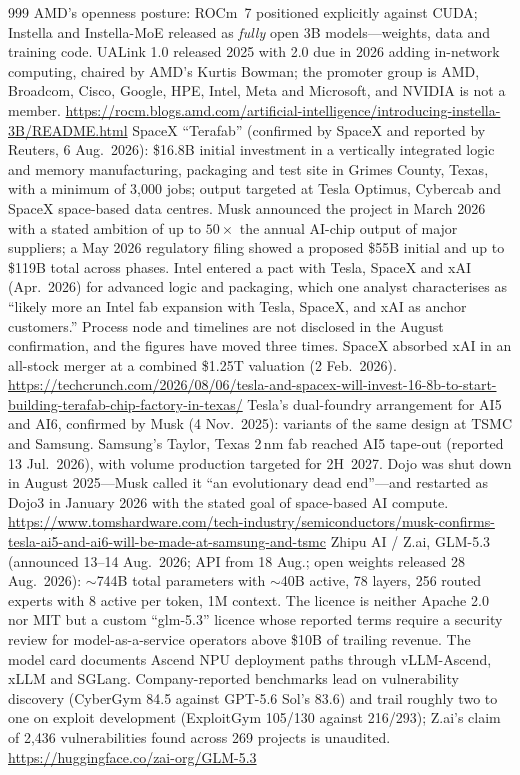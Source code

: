 \begin{thebibliography}{999}
 AMD's openness posture: ROCm~7 positioned explicitly against CUDA; Instella and Instella-MoE released as \emph{fully} open 3B models---weights, data and training code. UALink 1.0 released 2025 with 2.0 due in 2026 adding in-network computing, chaired by AMD's Kurtis Bowman; the promoter group is AMD, Broadcom, Cisco, Google, HPE, Intel, Meta and Microsoft, and NVIDIA is not a member. \url{https://rocm.blogs.amd.com/artificial-intelligence/introducing-instella-3B/README.html}
 SpaceX ``Terafab'' (confirmed by SpaceX and reported by Reuters, 6 Aug.\ 2026): \$16.8B initial investment in a vertically integrated logic and memory manufacturing, packaging and test site in Grimes County, Texas, with a minimum of 3{,}000 jobs; output targeted at Tesla Optimus, Cybercab and SpaceX space-based data centres. Musk announced the project in March 2026 with a stated ambition of up to $50\times$ the annual AI-chip output of major suppliers; a May 2026 regulatory filing showed a proposed \$55B initial and up to \$119B total across phases. Intel entered a pact with Tesla, SpaceX and xAI (Apr.\ 2026) for advanced logic and packaging, which one analyst characterises as ``likely more an Intel fab expansion with Tesla, SpaceX, and xAI as anchor customers.'' Process node and timelines are not disclosed in the August confirmation, and the figures have moved three times. SpaceX absorbed xAI in an all-stock merger at a combined \$1.25T valuation (2 Feb.\ 2026). \url{https://techcrunch.com/2026/08/06/tesla-and-spacex-will-invest-16-8b-to-start-building-terafab-chip-factory-in-texas/}
 Tesla's dual-foundry arrangement for AI5 and AI6, confirmed by Musk (4 Nov.\ 2025): variants of the same design at TSMC and Samsung. Samsung's Taylor, Texas 2\,nm fab reached AI5 tape-out (reported 13 Jul.\ 2026), with volume production targeted for 2H~2027. Dojo was shut down in August 2025---Musk called it ``an evolutionary dead end''---and restarted as Dojo3 in January 2026 with the stated goal of space-based AI compute. \url{https://www.tomshardware.com/tech-industry/semiconductors/musk-confirms-tesla-ai5-and-ai6-will-be-made-at-samsung-and-tsmc}
 Zhipu AI / Z.ai, GLM-5.3 (announced 13--14 Aug.\ 2026; API from 18 Aug.; open weights released 28 Aug.\ 2026): $\sim$744B total parameters with $\sim$40B active, 78 layers, 256 routed experts with 8 active per token, 1M context. The licence is neither Apache 2.0 nor MIT but a custom ``glm-5.3'' licence whose reported terms require a security review for model-as-a-service operators above \$10B of trailing revenue. The model card documents Ascend NPU deployment paths through vLLM-Ascend, xLLM and SGLang. Company-reported benchmarks lead on vulnerability discovery (CyberGym 84.5 against GPT-5.6 Sol's 83.6) and trail roughly two to one on exploit development (ExploitGym 105/130 against 216/293); Z.ai's claim of 2{,}436 vulnerabilities found across 269 projects is unaudited. \url{https://huggingface.co/zai-org/GLM-5.3}

\end{thebibliography}
